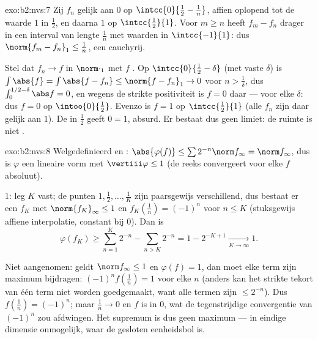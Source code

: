 \begin{solution}{exo:b2:nvs:7}
Zij $f_n$ gelijk aan $0$ op $\intcc{0}{\frac12 - \frac1n}$, affien
oplopend tot de waarde $1$ in $\frac12$, en daarna $1$ op
$\intcc{\frac12}{1}$. Voor $m \geq n$ heeft $f_m - f_n$ drager in
een interval van lengte $\frac1n$ met waarden in $\intcc{-1}{1}$:
dus $\norm{f_m - f_n}_1 \leq \frac1n$, een cauchyrij.

Stel dat $f_n \to f$ in $\norm\cdot_1$ met $f$ . Op
$\intcc{0}{\frac12 - \delta}$ (met vaste $\delta$) is $\int \abs{f}
= \int\abs{f - f_n} \leq \norm{f - f_n}_1 \to 0$ voor $n >
\frac1\delta$, dus $\int_0^{1/2 - \delta}\abs f = 0$, en wegens de
strikte positiviteit is $f = 0$ daar --- voor elke $\delta$: dus $f
= 0$ op $\intoo{0}{\frac12}$. Evenzo is $f = 1$ op
$\intcc{\frac12}{1}$ (alle $f_n$ zijn daar gelijk aan $1$). De
 in $\frac12$ geeft $0 = 1$, absurd. Er bestaat dus
geen limiet: de ruimte is niet .
\end{solution}

\begin{solution}{exo:b2:nvs:8}
Welgedefinieerd en : $\abs{\varphi(f)} \leq \sum 2^{-n}
\norm f_\infty = \norm f_\infty$, dus is $\varphi$ een lineaire
vorm met $\vertiii\varphi \leq 1$ (de reeks convergeert voor elke
$f$ absoluut).

 $1$: leg $K$ vast; de punten $1, \frac12, \dots, \frac1K$ zijn
paarsgewijs verschillend, dus bestaat er een  $f_K$ met
$\norm{f_K}_\infty \leq 1$ en $f_K(\frac1n) = (-1)^n$ voor $n \leq
K$ (stuksgewijs affiene interpolatie, constant bij $0$). Dan is
\[
\varphi(f_K) \geq \sum_{n=1}^{K} 2^{-n} - \sum_{n > K} 2^{-n}
= 1 - 2^{-K+1} \xrightarrow[K \to \infty]{} 1 .
\]

Niet aangenomen: geldt $\norm f_\infty \leq 1$ en $\varphi(f) = 1$,
dan moet elke term zijn maximum bijdragen: $(-1)^n f(\frac1n) = 1$
voor elke $n$ (anders kan het strikte tekort van één term niet
worden goedgemaakt, want alle termen zijn $\leq 2^{-n}$). Dus
$f(\frac1n) = (-1)^n$; maar $\frac1n \to 0$ en $f$ is  in
$0$, wat de tegenstrijdige convergentie van $(-1)^n$ zou
afdwingen. Het supremum is dus geen maximum --- in eindige
dimensie onmogelijk, waar de gesloten eenheidsbol  is.
\end{solution}

